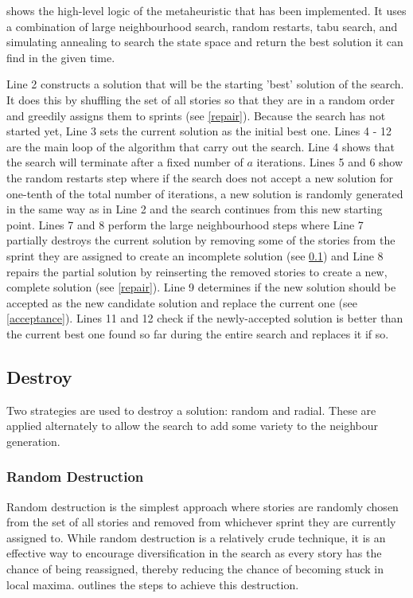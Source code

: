  shows the high-level logic of the metaheuristic that has been implemented. It uses a combination of large neighbourhood search, random restarts, tabu search, and simulating annealing to search the state space and return the best solution it can find in the given time.

Line 2 constructs a solution that will be the starting 'best' solution of the search. It does this by shuffling the set of all stories so that they are in a random order and greedily assigns them to sprints (see \cref{repair}). Because the search has not started yet, Line 3 sets the current solution as the initial best one. Lines 4 - 12 are the main loop of the algorithm that carry out the search. Line 4 shows that the search will terminate after a fixed number of $a$ iterations. Lines 5 and 6 show the random restarts step where if the search does not accept a new solution for one-tenth of the total number of iterations, a new solution is randomly generated in the same way as in Line 2 and the search continues from this new starting point. Lines 7 and 8 perform the large neighbourhood steps where Line 7 partially destroys the current solution by removing some of the stories from the sprint they are assigned to create an incomplete solution (see \cref{destroy}) and Line 8 repairs the partial solution by reinserting the removed stories to create a new, complete solution (see \cref{repair}). Line 9 determines if the new solution should be accepted as the new candidate solution and replace the current one (see \cref{acceptance}). Lines 11 and 12 check if the newly-accepted solution is better than the current best one found so far during the entire search and replaces it if so.

\subsection{Destroy} \label{destroy}

Two strategies are used to destroy a solution: random and radial. These are applied alternately to allow the search to add some variety to the neighbour generation.

\subsubsection{Random Destruction}

Random destruction is the simplest approach where stories are randomly chosen from the set of all stories and removed from whichever sprint they are currently assigned to. While random destruction is a relatively crude technique, it is an effective way to encourage diversification in the search as every story has the chance of being reassigned, thereby reducing the chance of becoming stuck in local maxima.  outlines the steps to achieve this destruction.

